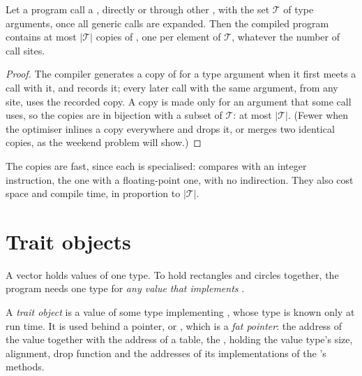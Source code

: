 \begin{proposition}\label{prop:b2:rust-traits-and-generics:mono}
Let a program call a  , directly or through other , with the set
$\mathcal{T}$ of type arguments, once all generic calls are expanded. Then the compiled program contains at most
$|\mathcal{T}|$ copies of , one per element of $\mathcal{T}$, whatever the number of call sites.
\end{proposition}

\begin{proof}
The compiler generates a copy of  for a type argument when it first meets a call with it, and records it;
every later call with the same argument, from any site, uses the recorded copy. A copy is made only for an argument
that some call uses, so the copies are in bijection with a subset of $\mathcal{T}$: at most $|\mathcal{T}|$. (Fewer
when the optimiser inlines a copy everywhere and drops it, or merges two identical copies, as the weekend problem
will show.)
\end{proof}

The copies are fast, since each is specialised:  compares with an integer instruction, the
 one with a floating-point one, with no indirection. They also cost space and compile time, in proportion
to $|\mathcal{T}|$.

\section{Trait objects}\label{sec:b2:rust-traits-and-generics:dyn}

A vector holds values of one type. To hold rectangles and circles together, the program needs one type for
\emph{any value that implements }.

\begin{definition}\label{def:b2:rust-traits-and-generics:trait-object}
A \emph{trait object}  is a value of some type implementing , whose
type is known only at run time. It is used behind a pointer,  or , which is a
\emph{fat pointer}: the address of the value together with the address of a table, the
\emph{}, holding the value type's size, alignment, drop function and the addresses of its implementations of
the 's methods.
\end{definition}

